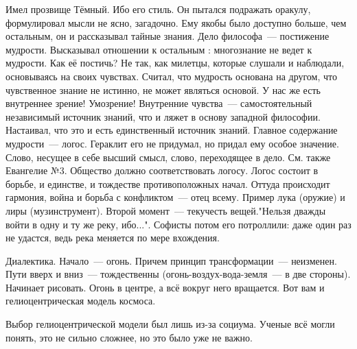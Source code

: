 Имел прозвище Тёмный. Ибо его стиль. Он пытался подражать оракулу, формулировал мысли не ясно, загадочно. 
Ему якобы было доступно больше, чем остальным, он и рассказывал тайные знания. 
Дело философа~--- постижение мудрости. Высказывал отношении к остальным : многознание не ведет к мудрости. Как её постичь? 
Не так, как милетцы, которые слушали и наблюдали, основываясь на своих чувствах. Считал, что мудрость основана на другом, что чувственное знание не истинно, не может являться основой. 
У нас же есть внутреннее зрение! Умозрение! Внутренние чувства~--- самостоятельный независимый источник знаний, что и ляжет в основу западной философии. Настаивал, что это и есть единственный источник знаний. 
Главное содержание мудрости~--- логос. Гераклит его не придумал, но придал ему особое значение. Слово, несущее в себе высший смысл, слово, переходящее в дело. См. также Евангелие №3. 
Общество должно соответствовать логосу. Логос состоит в борьбе, и единстве, и тождестве противоположных начал. Оттуда происходит гармония, война и борьба с конфликтом~--- отец всему. 
Пример лука (оружие) и лиры (музинструмент). Второй момент~--- текучесть вещей."Нельзя дважды войти в одну и ту же реку, ибо...". Софисты потом его потроллили: даже один раз не удастся, ведь река меняется по мере вхождения. 

Диалектика. 
Начало~--- огонь. Причем принцип трансформации~--- неизменен. Пути вверх и вниз~--- тождественны (огонь-воздух-вода-земля~--- в две стороны). Начинает рисовать. Огонь в центре, а всё вокруг него вращается. Вот вам и гелиоцентрическая модель космоса. 

Выбор гелиоцентрической модели был лишь из-за социума. Ученые всё могли понять, это не сильно сложнее, но это было уже не важно. 
